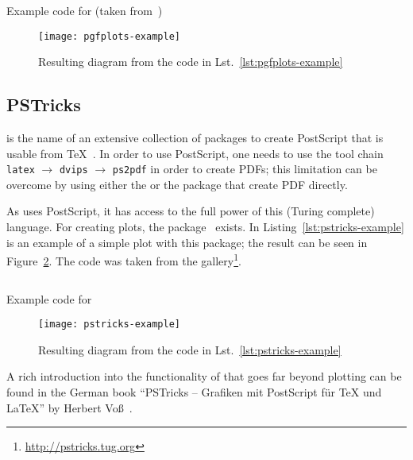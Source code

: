 \begin{listing}[H]
  \inputminted{latex}{../examples/pgfplots-example.tex}
  \caption{Example code for  (taken
    from~\cite{Feuersaenger2016})}
  \label{lst:pgfplots-example}
\end{listing}
\begin{figure}[!t]
  \centering
  \texttt{[image: pgfplots-example]}
  \caption{Resulting diagram from the code in Lst.~\ref{lst:pgfplots-example}}
  \label{fig:pgfplots-example}
\end{figure}

\subsection{PSTricks}

 is the name of an extensive collection of packages to create
PostScript that is usable from \TeX~\cite{Zandt2007}.  In order to use
PostScript, one needs to use the tool chain \texttt{latex} $\rightarrow$
\texttt{dvips} $\rightarrow$ \texttt{ps2pdf} in order to create PDFs; this
limitation can be overcome by using either the  or the
 package that create PDF directly.

As  uses PostScript, it has access to the full power of this
(Turing complete) language.  For creating plots, the 
package~\cite{Voss2016a} exists.  In Listing~\ref{lst:pstricks-example} is an
example of a simple plot with this package; the result can be seen in
Figure~\ref{fig:pstricks-example}.  The code was taken from the
 gallery\footnote{\href{http://pstricks.tug.org}%
{http://pstricks.tug.org}}.

\begin{listing}[H]
  \inputminted{latex}{../examples/pstricks-example.tex}
  \caption{Example code for }
  \label{lst:pstricks-example}
\end{listing}
\begin{figure}[!t]
  \centering
  \texttt{[image: pstricks-example]}
  \caption{Resulting diagram from the code in Lst.~\ref{lst:pstricks-example}}
  \label{fig:pstricks-example}
\end{figure}

A rich introduction into the functionality of  that goes far
beyond plotting can be found in the German book \enquote{PSTricks -- Grafiken
mit PostScript für \TeX{} und \LaTeX{}} by Herbert Voß~\cite{Voss2016}.

